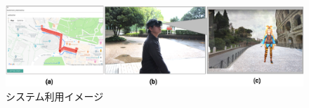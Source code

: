 \begin{figure}[ht]
 \begin{center}
  \includegraphics[width=16cm]{img/04_detail/useimage.eps}
  \caption{システム利用イメージ}
  \label{figure:usecase}
 \end{center}
\end{figure}

\clearpage

\clearpage


\clearpage

